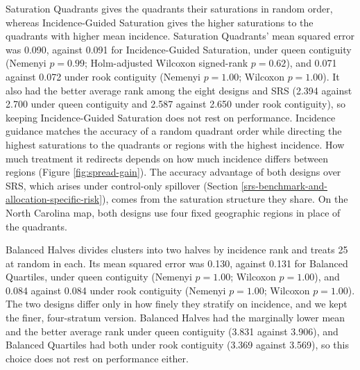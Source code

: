 \documentclass[11pt]{article}
\begin{document}
Saturation Quadrants gives the quadrants their saturations in random
order, whereas Incidence-Guided Saturation gives the higher saturations
to the quadrants with higher mean incidence. Saturation Quadrants' mean
squared error was 0.090, against 0.091 for Incidence-Guided Saturation,
under queen contiguity (Nemenyi \(p = 0.99\); Holm-adjusted Wilcoxon
signed-rank \(p = 0.62\)), and 0.071 against 0.072 under rook
contiguity (Nemenyi \(p = 1.00\); Wilcoxon \(p = 1.00\)). It also had
the better average rank among the eight designs and SRS (2.394 against 2.700 under queen contiguity and
2.587 against 2.650 under rook contiguity), so keeping Incidence-Guided
Saturation does not rest on performance. Incidence guidance matches the
accuracy of a random quadrant order while directing the highest
saturations to the quadrants or regions with the highest incidence. How
much treatment it redirects depends on how much incidence differs between
regions (Figure \ref{fig:spread-gain}). The accuracy advantage of both
designs over SRS, which arises under control-only spillover (Section
\ref{srs-benchmark-and-allocation-specific-risk}), comes from the
saturation structure they share. On the North Carolina map, both designs use four
fixed geographic regions in place of the quadrants.

Balanced Halves divides clusters into two halves by incidence rank and
treats 25 at random in each. Its mean squared error was 0.130, against
0.131 for Balanced Quartiles, under queen contiguity (Nemenyi
\(p = 1.00\); Wilcoxon \(p = 1.00\)), and 0.084 against 0.084 under
rook contiguity (Nemenyi \(p = 1.00\); Wilcoxon \(p = 1.00\)). The two
designs differ only in how finely they stratify on incidence, and we kept
the finer, four-stratum version. Balanced Halves had the marginally lower
mean and the better average rank under queen contiguity (3.831 against
3.906), and Balanced Quartiles had both under rook contiguity (3.369
against 3.569), so this choice does not rest on performance either.
\end{document}
